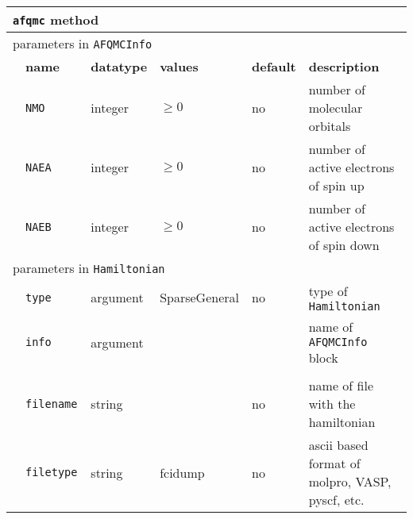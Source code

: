 \begin{table}[h]
\begin{center}
\begin{tabularx}{\textwidth}{l l l l l l }
\hline
\multicolumn{6}{l}{\texttt{afqmc} method} \\
\hline
\multicolumn{6}{l}{parameters in \texttt{AFQMCInfo}} \\
   &   \bfseries name     & \bfseries datatype & \bfseries values & \bfseries default   & \bfseries description \\
   &   \texttt{NMO             } &  integer     & $\ge 0$ & no & number of molecular orbitals \\
   &   \texttt{NAEA            } &  integer     & $\ge 0$ & no & number of active electrons of spin up \\
   &   \texttt{NAEB            } &  integer     & $\ge 0$ & no & number of active electrons of spin down \\
\multicolumn{6}{l}{parameters in \texttt{Hamiltonian}}  \\
   &   \texttt{type            } &  argument   & SparseGeneral & no   & type of \texttt{Hamiltonian} \\
   &   \texttt{info            } &  argument   &               &      & name of \texttt{AFQMCInfo} block \\\\
   &   \texttt{filename        } &  string     &               & no   & name of file with the hamiltonian \\
   &   \texttt{filetype        } &  string     & fcidump       & no   & ascii based format of molpro, VASP, pyscf, etc. \\

\end{tabularx}
\end{center}
\end{table}
